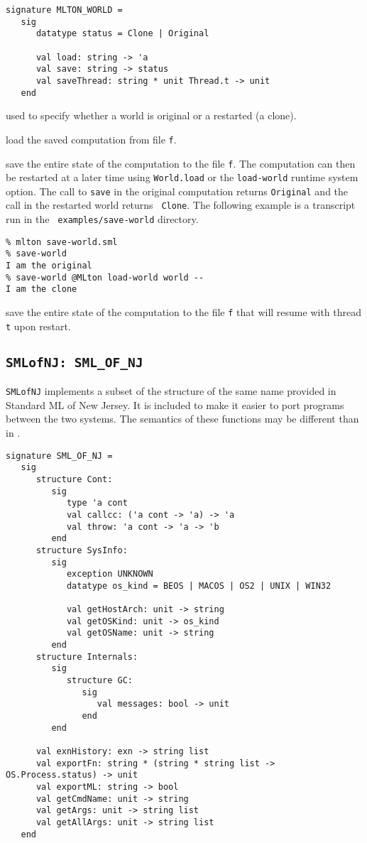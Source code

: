 \begin{verbatim}
signature MLTON_WORLD =
   sig
      datatype status = Clone | Original

      val load: string -> 'a
      val save: string -> status
      val saveThread: string * unit Thread.t -> unit
   end
\end{verbatim}

\begin{description}
used to specify whether a world is original or a restarted (a clone).

load the saved computation from file {\tt f}.

save the entire state of the computation to
the file {\tt f}.  The computation can then be restarted at a later
time using {\tt World.load} or the {\tt load-world} runtime system
option.  The call to {\tt save} in the original computation returns
{\tt Original} and the call in the restarted world returns {\tt
Clone}.  The following example is a transcript run in the {\tt
examples/save-world} directory.
\begin{verbatim}
% mlton save-world.sml
% save-world
I am the original
% save-world @MLton load-world world --
I am the clone
\end{verbatim}

save the entire state of the computation to
the file {\tt f} that will resume with thread {\tt t} upon restart.

\end{description}
%
\subsection{{\tt SMLofNJ: SML\_OF\_NJ}}

{\tt SMLofNJ} implements a subset of the structure of the same name
provided in Standard ML of New Jersey.  It is included to make it
easier to port programs between the two systems.  The semantics of
these functions may be different than in {\smlnj}.

\begin{verbatim}
signature SML_OF_NJ =
   sig
      structure Cont:
         sig
            type 'a cont
            val callcc: ('a cont -> 'a) -> 'a
            val throw: 'a cont -> 'a -> 'b
         end
      structure SysInfo:
         sig
            exception UNKNOWN
            datatype os_kind = BEOS | MACOS | OS2 | UNIX | WIN32

            val getHostArch: unit -> string
            val getOSKind: unit -> os_kind
            val getOSName: unit -> string
         end
      structure Internals:
         sig
            structure GC:
               sig
                  val messages: bool -> unit
               end             
         end

      val exnHistory: exn -> string list
      val exportFn: string * (string * string list -> OS.Process.status) -> unit
      val exportML: string -> bool
      val getCmdName: unit -> string
      val getArgs: unit -> string list
      val getAllArgs: unit -> string list
   end
\end{verbatim}


